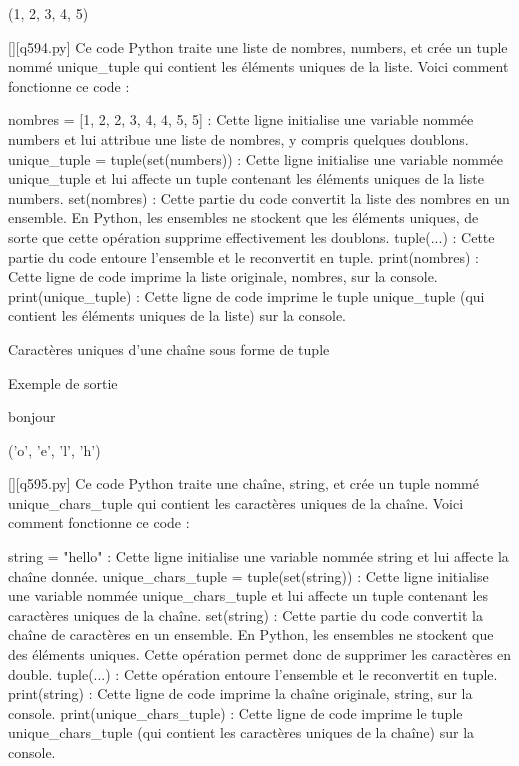 (1, 2, 3, 4, 5)
        \par
        \begin{solution}
            \renewcommand{\nomfichier}{q594.py}
            \pythonfile{\chemincode \nomfichier}[][\nomfichier]
            Ce code Python traite une liste de nombres, numbers, et crée un tuple nommé unique_tuple qui contient les éléments uniques de la liste. Voici comment fonctionne ce code :

    nombres = [1, 2, 2, 3, 4, 4, 5, 5] : Cette ligne initialise une variable nommée numbers et lui attribue une liste de nombres, y compris quelques doublons.
    unique_tuple = tuple(set(numbers)) : Cette ligne initialise une variable nommée unique_tuple et lui affecte un tuple contenant les éléments uniques de la liste numbers.
        set(nombres) : Cette partie du code convertit la liste des nombres en un ensemble. En Python, les ensembles ne stockent que les éléments uniques, de sorte que cette opération supprime effectivement les doublons.
        tuple(...) : Cette partie du code entoure l'ensemble et le reconvertit en tuple.
    print(nombres) : Cette ligne de code imprime la liste originale, nombres, sur la console.
    print(unique_tuple) : Cette ligne de code imprime le tuple unique_tuple (qui contient les éléments uniques de la liste) sur la console.
        \end{solution}
        

        \question
        Caractères uniques d'une chaîne sous forme de tuple

Exemple de sortie

bonjour

('o', 'e', 'l', 'h')
        \par
        \begin{solution}
            \renewcommand{\nomfichier}{q595.py}
            \pythonfile{\chemincode \nomfichier}[][\nomfichier]
            Ce code Python traite une chaîne, string, et crée un tuple nommé unique_chars_tuple qui contient les caractères uniques de la chaîne. Voici comment fonctionne ce code :

    string = "hello" : Cette ligne initialise une variable nommée string et lui affecte la chaîne donnée.
    unique_chars_tuple = tuple(set(string)) : Cette ligne initialise une variable nommée unique_chars_tuple et lui affecte un tuple contenant les caractères uniques de la chaîne.
        set(string) : Cette partie du code convertit la chaîne de caractères en un ensemble. En Python, les ensembles ne stockent que des éléments uniques. Cette opération permet donc de supprimer les caractères en double.
        tuple(...) : Cette opération entoure l'ensemble et le reconvertit en tuple.
    print(string) : Cette ligne de code imprime la chaîne originale, string, sur la console.
    print(unique_chars_tuple) : Cette ligne de code imprime le tuple unique_chars_tuple (qui contient les caractères uniques de la chaîne) sur la console.
        \end{solution}
        

